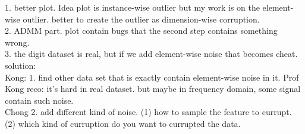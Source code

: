\documentclass{article}
\begin{document}
1. better plot. Idea plot is instance-wise outlier but my work is on the element-wise outlier.
 better to create the outlier as dimension-wise corruption.\\
2. ADMM part. plot contain bugs that the second step contains something wrong.\\
3. the digit dataset is real, but if we add element-wise noise that becomes cheat.\\
solution:\\

        Kong: 1. find other data set that is exactly contain element-wise noise in it.
                Prof Kong reco: it's hard in real dataset. but maybe in frequency domain, some signal contain such noise.\\
        Chong 2. add different kind of noise. (1) how to sample the feature to currupt.\\
                        (2) which kind of curruption do you want to currupted the data.
\end{document}

